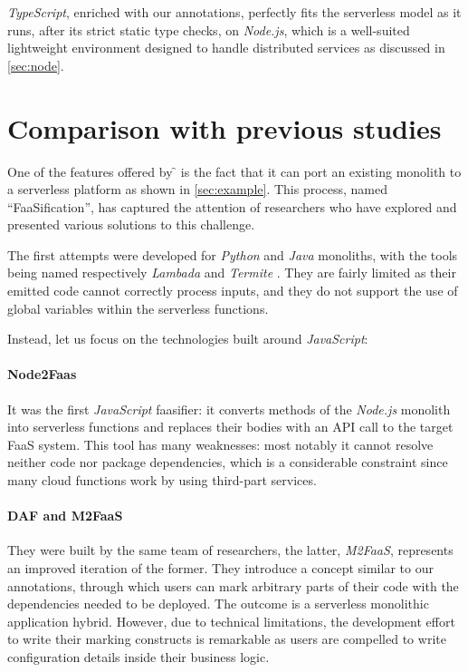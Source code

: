 \textit{TypeScript}, enriched with our annotations, perfectly fits
the serverless model as it runs, after its strict static type checks,
on \textit{Node.js}, which is a well-suited lightweight environment
designed to handle distributed services as discussed in \cref{sec:node}.

\section{Comparison with previous studies}

One of the features offered by \f{} is the fact that it can port
an existing monolith to a serverless platform as shown in \cref{sec:example}.
This process, named ``FaaSification'', has captured the attention of researchers
who have explored and presented various solutions to this challenge.

The first attempts were developed for \textit{Python} and \textit{Java} monoliths,
with the tools being named respectively \textit{Lambada} \cite{lambada} and \textit{Termite} \cite{termite}.
They are fairly limited as their emitted code cannot correctly process inputs,
and they do not support the use of global variables within the serverless functions.

Instead, let us focus on the technologies built around \textit{JavaScript}:

\paragraph{\textbf{Node2Faas} \cite{node2faas}}
It was the first \textit{JavaScript} faasifier:
it converts methods of the \textit{Node.js} monolith into serverless
functions and replaces their bodies with an API call to the target FaaS system.
This tool has many weaknesses: most notably it cannot resolve neither code
nor package dependencies, which is a considerable constraint since many
cloud functions work by using third-part services.

\paragraph{\textbf{DAF} and \textbf{M2FaaS} \cite{daf, m2faas}}
They were built by the same team of researchers, the latter, \textit{M2FaaS},
represents an improved iteration of the former.
They introduce a concept similar to our annotations, through which users
can mark arbitrary parts of their code with the dependencies needed to be deployed.
The outcome is a serverless monolithic application hybrid. 
However, due to technical limitations, the development effort to write their marking constructs
is remarkable as users are compelled to write configuration details inside their business logic.

